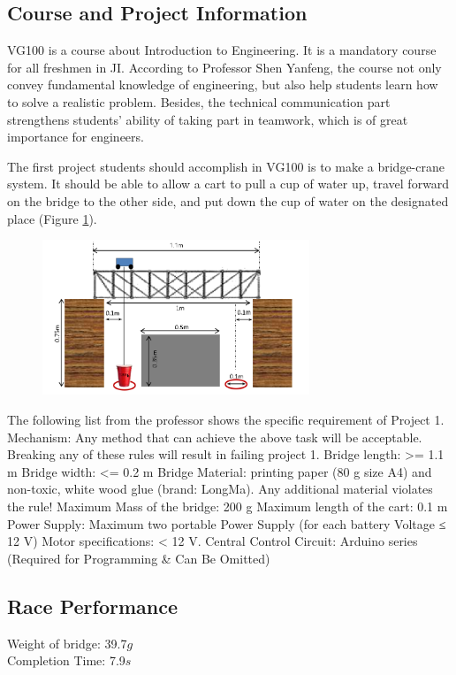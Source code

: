 \subsection{Course and Project Information}


VG100 is a course about Introduction to Engineering. It is a mandatory course
for all freshmen in JI. According to Professor Shen Yanfeng, the course not only
convey fundamental knowledge of engineering, but also help students learn how to
solve a realistic problem. Besides, the technical communication part strengthens
students’ ability of taking part in teamwork, which is of great importance for
engineers.  

The first project students should accomplish in VG100 is to make a bridge-crane
system. It should be able to allow a cart to pull a cup of water up, travel
forward on the bridge to the other side, and put down the cup of water on the
designated place (Figure \ref{fig:structureOfP1}).  

\begin{figure}[H]
\centering
\includegraphics[width=8cm]{figure/structureOfP1}
\caption{\label{fig:structureOfP1}}
\end{figure}

The following list from the professor shows the specific requirement of Project 1.
Mechanism: Any method that can achieve the above task will be acceptable.
Breaking any of these rules will result in failing project 1.  
Bridge length:  >= 1.1 m 
Bridge width:  <= 0.2 m 
Bridge Material: printing paper (80 g size A4) and non-toxic, white wood glue
(brand: LongMa). Any additional material violates the rule!  
Maximum Mass of the bridge: 200 g 
Maximum length of the cart: 0.1 m 
Power Supply: Maximum two portable Power Supply (for each battery Voltage ≤ 12 V) 
Motor specifications: < 12 V.  
Central Control Circuit: Arduino series (Required for Programming \& Can Be Omitted)

\subsection{Race Performance}
\noindent
Weight of bridge: 39.7$g$ \\
Completion Time: 7.9$s$